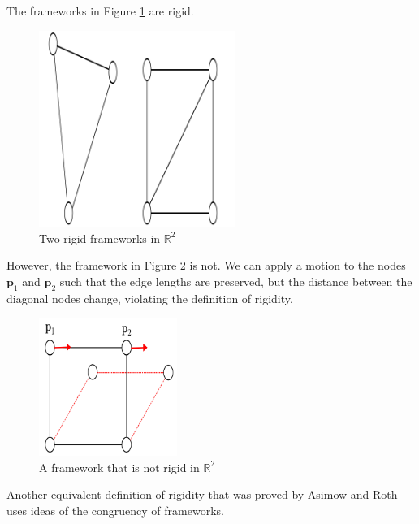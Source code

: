 \begin{example}
\label{eg: rigid graphs}    
The frameworks in Figure \ref{fig: rigid_graphs} are rigid. 

\vspace{3mm}
\begin{figure}[htbp]
    \centering
    \includegraphics[width=0.57\textwidth]{Chapter 2/7. rigid_graphs.png} 
    \caption{Two rigid frameworks in $\mathbb{R}^2$}
    \label{fig: rigid_graphs}
\end{figure}
\vspace{-3mm}
\begin{flushleft}
However, the framework in Figure \ref{eg: not_rigid} is not. We can apply a motion to the nodes $\textbf{p}_1$ and $\textbf{p}_2$ such that the edge lengths are preserved, but the distance between the diagonal nodes change, violating the definition of rigidity.    
\end{flushleft}

\begin{figure}[htbp]
    \centering
    \includegraphics[width = 0.4\textwidth]{Chapter 2/8. not_rigid.png}
    \caption{A framework that is not rigid in $\mathbb{R}^2$}
    \label{eg: not_rigid}
\end{figure}
\end{example}
\vspace{-5 mm}
\begin{flushleft}

\vspace{-3mm}
Another equivalent definition of rigidity that was proved by Asimow and Roth \cite{asimow} uses ideas of the congruency of frameworks.
\end{flushleft}

